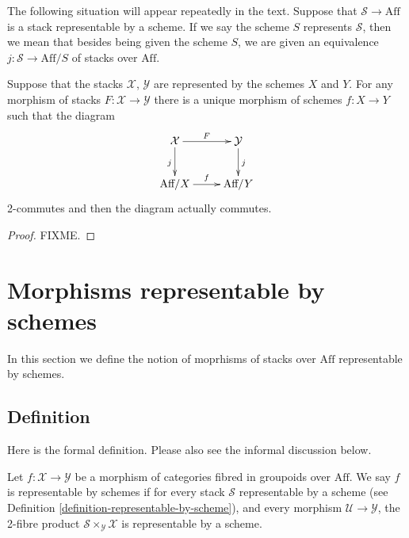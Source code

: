 \begin{situation}
\label{situation-stack-represented-by-scheme}
The following situation will appear repeatedly in the text. Suppose that
$\mathcal{S} \to \text{Aff}$ is a stack representable by a scheme. If we
say the scheme $S$ represents $\mathcal{S}$, then we mean that besides 
being given the scheme $S$, we are given an equivalence $j : \mathcal{S}
\to \text{Aff}/S$ of stacks over $\text{Aff}$.
\end{situation}

\begin{lemma}
\label{lemma-morphism-stacks-representable-by-schemes}
Suppose that the stacks $\mathcal{X}$, $\mathcal{Y}$ are represented
by the schemes $X$ and $Y$. For any morphism of stacks $F : \mathcal{X}
\to \mathcal{Y}$ there is a unique morphism of schemes $f : X \to Y$
such that the diagram
$$
\xymatrix{
\mathcal{X} \ar[r]^F \ar[d]_j & \mathcal{Y} \ar[d]^j \\
\text{Aff}/X \ar[r]^f & \text{Aff}/Y}
$$
2-commutes and then the diagram actually commutes.
\end{lemma}

\begin{proof}
FIXME.
\end{proof}

\section{Morphisms representable by schemes}
\label{section-morphisms-representable-by-schemes}

\noindent
In this section we define the notion of moprhisms of stacks over $\text{Aff}$
representable by schemes.

\subsection{Definition}
\label{subsection-definition-representable-by-schemes}

\noindent
Here is the formal definition. Please also see the informal discussion below.

\begin{definition}
\label{definition-representable-by-schemes}
Let $f : \mathcal{X} \to \mathcal{Y}$ be a morphism of categories
fibred in groupoids over $\text{Aff}$. We say $f$ is representable by
schemes if for every stack $\mathcal{S}$ representable by a scheme
(see Definition \ref{definition-representable-by-scheme}), and every morphism
$\mathcal{U} \to \mathcal{Y}$, the 2-fibre product
$\mathcal{S}\times_\mathcal{Y}\mathcal{X}$ is representable by a scheme.
\end{definition}

